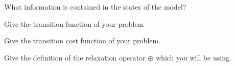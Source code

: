 \documentclass[12pt]{report}
\newcommand{\answerbox}[2]{\hfill\break\\
        \framebox[\linewidth]{\parbox[c][#1][c]{\dimexpr\linewidth-2\fboxsep-2\fboxrule}{#2}}
}
\begin{document}
\begin{Exercise}[title={Building Nuclear Plants}]
\begin{center}
\end{center}

\Question What information is contained in the states of the model?
\answerbox{4cm}{
}

\Question Give the transition function of your problem
\answerbox{3cm}{
}

\Question Give the transition cost function of your problem.
\answerbox{3cm}{
}

\Question Give the definition of the relaxation operator $\oplus$ which you will be using.
\answerbox{3cm}{
}
\end{Exercise}
\end{document}
